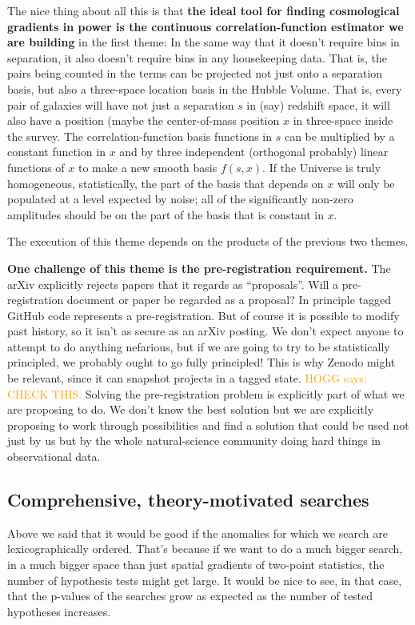 \documentclass[12pt, fullpage, letterpaper]{article}
\newcommand{\HOGG}[1]{\textcolor{orange}{HOGG says: #1}}
\begin{document}
The nice thing about all this is that \textbf{the ideal tool for
  finding cosmological gradients in power is the continuous
  correlation-function estimator we are building} in the first theme:
In the same way that it doesn't require bins in separation, it also
doesn't require bins in any housekeeping data. That is, the pairs
being counted in the terms can be projected not just onto a separation
basis, but also a three-space location basis in the Hubble
Volume. That is, every pair of galaxies will have not just a
separation $s$ in (say) redshift space, it will also have a position
(maybe the center-of-mass position $x$ in three-space inside the
survey.  The correlation-function basis functions in $s$ can be
multiplied by a constant function in $x$ and by three independent (orthogonal
probably) linear functions of
$x$ to make a new smooth basis $f(s,x)$. If the Universe is truly
homogeneous, statistically, the part of the basis that depends on $x$
will only be populated at a level expected by noise; all of the
significantly non-zero amplitudes should be on the part of the basis
that is constant in $x$.

The execution of this theme depends on the products of the
previous two themes.

\textbf{One challenge of this theme is the pre-registration requirement.}
The arXiv explicitly rejects papers that it regards as ``proposals''. Will a
pre-registration document or paper be regarded as a proposal? In principle
tagged GitHub code represents a pre-registration. But of course it is possible
to modify past history, so it isn't as secure as an arXiv posting.
We don't expect anyone to attempt to do anything nefarious, but if we are
going to try to be statistically principled, we probably ought to go fully principled!
This is why Zenodo might be relevant, since it can snapshot projects in a tagged
state. \HOGG{CHECK THIS.}
Solving the pre-registration problem is explicitly part of what we are proposing to do.
We don't know the best solution but we are explicitly proposing to work through possibilities
and find a solution that could be used not just by us but by the whole natural-science
community doing hard things in observational data.

\subsection{Comprehensive, theory-motivated searches}

Above we said that it would be good if the anomalies for which we search are
lexicographically ordered.
That's because if we want to do a much bigger search, in a much bigger space
than just spatial gradients of two-point statistics, the number of hypothesis
tests might get large.
It would be nice to see, in that case, that the p-values of the searches
grow as expected as the number of tested hypotheses increases.
\end{document}
